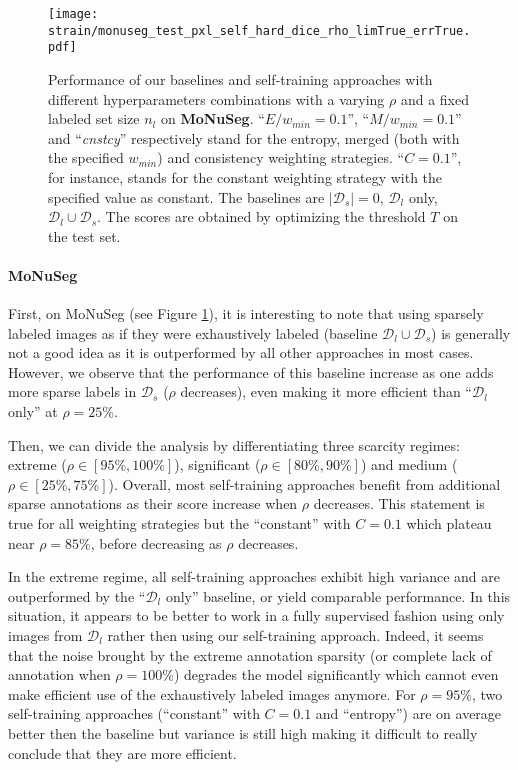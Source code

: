 \begin{figure}
  \centering
  \texttt{[image: strain/monuseg\_test\_pxl\_self\_hard\_dice\_rho\_limTrue\_errTrue.pdf]}
  \caption{Performance of our baselines and self-training approaches with different hyperparameters combinations with a varying $\rho$ and a fixed labeled set size $n_l$ on \textbf{MoNuSeg}. ``$E / w_{min} = 0.1$'', ``$M / w_{min} = 0.1$'' and ``\textit{cnstcy}'' respectively stand for the entropy, merged (both with the specified $w_{min}$) and consistency weighting strategies. ``$C = 0.1$'', for instance, stands for the constant weighting strategy with the specified value as constant. The baselines are $|\mathcal{D}_s| = 0$, $\mathcal{D}_l$ only, $\mathcal{D}_l \cup \mathcal{D}_s$. The scores are obtained by optimizing the threshold $T$ on the test set.}
  \label{fig:strain:rho_exp_monuseg}
\end{figure}

\paragraph{MoNuSeg} First, on MoNuSeg (see Figure \ref{fig:strain:rho_exp_monuseg}), it is interesting to note that using sparsely labeled images as if they were exhaustively labeled (\ie baseline $\mathcal{D}_l \cup \mathcal{D}_s$) is generally not a good idea as it is outperformed by all other approaches in most cases. However, we observe that the performance of this baseline increase as one adds more sparse labels in $\mathcal{D}_s$ (\ie $\rho$ decreases), even making it more efficient than ``$\mathcal{D}_l$ only'' at $\rho = 25\%$. 

Then, we can divide the analysis by differentiating three scarcity regimes: extreme ($\rho \in [95\%, 100\%]$), significant ($\rho \in [80\%, 90\%]$) and medium ($\rho \in [25\%, 75\%]$). Overall, most self-training approaches benefit from additional sparse annotations as their score increase when $\rho$ decreases. This statement is true for all weighting strategies but the ``constant'' with $C = 0.1$ which plateau near $\rho = 85\%$, before decreasing as $\rho$ decreases. 

In the extreme regime, all self-training approaches exhibit high variance and are outperformed by the ``$\mathcal{D}_l$ only'' baseline, or yield comparable performance. In this situation, it appears to be better to work in a fully supervised fashion using only images from $\mathcal{D}_l$ rather then using our self-training approach. Indeed, it seems that the noise brought by the extreme annotation sparsity (or complete lack of annotation when $\rho = 100\%$) degrades the model significantly which cannot even make efficient use of the exhaustively labeled images anymore. For $\rho = 95\%$, two self-training approaches (``constant'' with $C = 0.1$ and ``entropy'') are on average better then the baseline but variance is still high making it difficult to really conclude that they are more efficient. 

